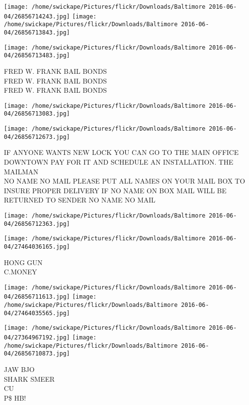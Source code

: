\documentclass[10pt,letterpaper]{article}
\begin{document}
\texttt{[image: /home/swickape/Pictures/flickr/Downloads/Baltimore 2016-06-04/26856714243.jpg]}
\texttt{[image: /home/swickape/Pictures/flickr/Downloads/Baltimore 2016-06-04/26856713843.jpg]}

\texttt{[image: /home/swickape/Pictures/flickr/Downloads/Baltimore 2016-06-04/26856713483.jpg]}

FRED W. FRANK BAIL BONDS\\
FRED W. FRANK BAIL BONDS\\
FRED W. FRANK BAIL BONDS\\
\pagebreak

\texttt{[image: /home/swickape/Pictures/flickr/Downloads/Baltimore 2016-06-04/26856713083.jpg]}

\vspace{0.25in}
\texttt{[image: /home/swickape/Pictures/flickr/Downloads/Baltimore 2016-06-04/26856712673.jpg]}

IF ANYONE WANTS NEW LOCK YOU CAN GO TO THE MAIN OFFICE DOWNTOWN PAY FOR IT AND SCHEDULE AN INSTALLATION. THE MAILMAN\\
NO NAME NO MAIL PLEASE PUT ALL NAMES ON YOUR MAIL BOX TO INSURE PROPER DELIVERY IF NO NAME ON BOX MAIL WILL BE RETURNED TO SENDER NO NAME NO MAIL\\
\pagebreak

\texttt{[image: /home/swickape/Pictures/flickr/Downloads/Baltimore 2016-06-04/26856712363.jpg]}

\vspace{0.25in}
\texttt{[image: /home/swickape/Pictures/flickr/Downloads/Baltimore 2016-06-04/27464036165.jpg]}

HONG GUN\\
C.MONEY\\
\pagebreak

\texttt{[image: /home/swickape/Pictures/flickr/Downloads/Baltimore 2016-06-04/26856711613.jpg]}
\texttt{[image: /home/swickape/Pictures/flickr/Downloads/Baltimore 2016-06-04/27464035565.jpg]}

\texttt{[image: /home/swickape/Pictures/flickr/Downloads/Baltimore 2016-06-04/27364967192.jpg]}
\texttt{[image: /home/swickape/Pictures/flickr/Downloads/Baltimore 2016-06-04/26856710873.jpg]}

JAW BJO\\
SHARK SMEER\\
CU\\
P\$ HB!\\
\pagebreak
\end{document}
